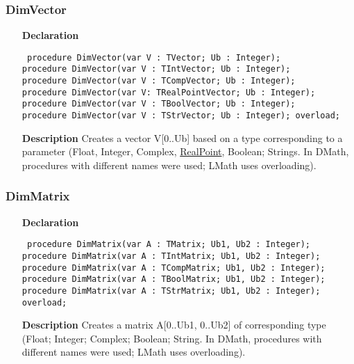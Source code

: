 \documentclass[12pt,a4paper,oneside]{report}
\newcommand{\lmath}[1]{   %
	\marginpar{\vspace{#1} 
		\begin{flushright}
			LMath
	\end{flushright} }
}
\newcommand{\declarationitem}[1]{\textbf{#1}}
\newcommand{\descriptiontitle}[1]{\textbf{#1}}
\newcommand{\code}[1]{\texttt{#1}}
\begin{document}
\subsubsection{DimVector}\lmath{-24pt}
\label{utypes-DimVector}
\begin{itemize}\item[\declarationitem{Declaration}\hfill]
	\begin{flushleft}
		\code{
			procedure DimVector(var V : TVector; Ub : Integer);\\
			procedure DimVector(var V : TIntVector; Ub : Integer);\\
			procedure DimVector(var V : TCompVector; Ub : Integer); \\
			procedure DimVector(var V: TRealPointVector; Ub : Integer); \\
			procedure DimVector(var V : TBoolVector; Ub : Integer); \\
			procedure DimVector(var V : TStrVector; Ub : Integer); overload;}
	\end{flushleft}
	\item[\descriptiontitle{Description}]
	Creates a vector V[0..Ub] based on a type corresponding to a parameter (Float, Integer, Complex, \hyperref[types:trealpoint]{RealPoint}, Boolean; Strings. In DMath, procedures with different names were used; LMath uses overloading).
\end{itemize}
\subsubsection{DimMatrix}\lmath{-24pt}
\label{utypes-DimMatrix}
\begin{itemize}\item[\declarationitem{Declaration}\hfill]
	\begin{flushleft}
		\code{
			procedure DimMatrix(var A : TMatrix; Ub1, Ub2 : Integer); \\
			procedure DimMatrix(var A : TIntMatrix; Ub1, Ub2 : Integer); \\
			procedure DimMatrix(var A : TCompMatrix; Ub1, Ub2 : Integer);\\
			procedure DimMatrix(var A : TBoolMatrix; Ub1, Ub2 : Integer); \\
			procedure DimMatrix(var A : TStrMatrix; Ub1, Ub2 : Integer); overload;}
	\end{flushleft}
	\item[\descriptiontitle{Description}]
	Creates a matrix A[0..Ub1, 0..Ub2] of corresponding type (Float; Integer; Complex; Boolean; String. In DMath, procedures with different names were used; LMath uses overloading).
\end{itemize}
\end{document}
